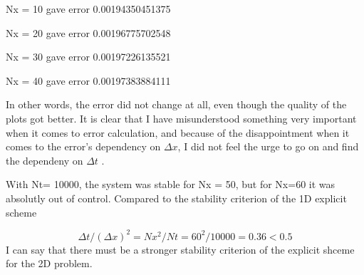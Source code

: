 \documentclass{article}
\begin{document}
Nx = 10 gave error
0.00194350451375

Nx = 20 gave error
0.00196775702548

Nx = 30 gave error
0.00197226135521

Nx = 40 gave error
0.00197383884111

In other words, the error did not change at all, even though the quality of the plots got better. It is clear that I have misunderstood something very important when it comes to error calculation, and because of the disappointment when it comes to the error's dependency on $\Delta x$, I did not feel the urge to go on and find the dependeny on $\Delta t$ .

With Nt= 10000, the system was stable for Nx = 50, but for Nx=60 it was absolutly out of control. Compared to the stability criterion of the 1D explicit scheme

$$\Delta t /(\Delta x)^2 = Nx^2/Nt = 60^2/10000 = 0.36<0.5$$
I can say that there must be a stronger stability criterion of the explicit shceme for the 2D problem. 
\end{document}
